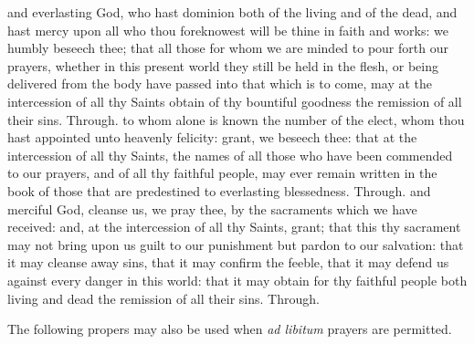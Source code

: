 \begin{multicols}{2}
    \label{SPLivingDeparted}
    and everlasting God, who hast dominion both of the living and of the dead, and hast mercy upon all who thou foreknowest will be thine in faith and works: we humbly beseech thee; that all those for whom we are minded to pour forth our prayers, whether in this present world they still be held in the flesh, or being delivered from the body have passed into that which is to come, may at the intercession of all thy Saints obtain of thy bountiful goodness the remission of all their sins. Through.
    to whom alone is known the number of the elect, whom thou hast appointed unto heavenly felicity: grant, we beseech thee: that at the intercession of all thy Saints, the names of all those who have been commended to our prayers, and of all thy faithful people, may ever remain written in the book of those that are predestined to everlasting blessedness. Through.
    and merciful God, cleanse us, we pray thee, by the sacraments which we have received: and, at the intercession of all thy Saints, grant; that this thy sacrament may not bring upon us guilt to our punishment but pardon to our salvation: that it may cleanse away sins, that it may confirm the feeble, that it may defend us against every danger in this world: that it may obtain for thy faithful people both living and dead the remission of all their sins. Through.
 \end{multicols}
\vspace{-1ex}
\begin{rubric}
    The following propers may also be used when \emph{ad libitum} prayers are permitted.
\end{rubric}
\vspace{-1ex}
